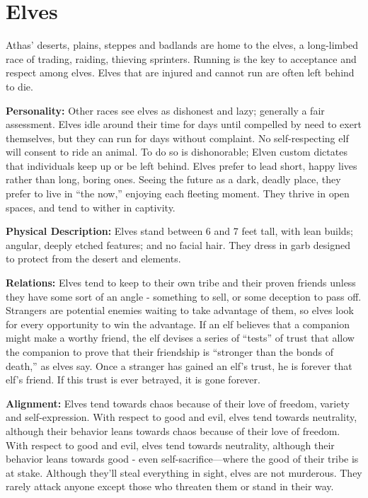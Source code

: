\section{Elves}

Athas' deserts, plains, steppes and badlands are home to the elves, a long-limbed race of trading, raiding, thieving sprinters. Running is the key to acceptance and respect among elves. Elves that are injured and cannot run are often left behind to die.

\textbf{Personality:} Other races see elves as dishonest and lazy; generally a fair assessment. Elves idle around their time for days until compelled by need to exert themselves, but they can run for days without complaint. No self-respecting elf will consent to ride an animal. To do so is dishonorable; Elven custom dictates that individuals keep up or be left behind. Elves prefer to lead short, happy lives rather than long, boring ones. Seeing the future as a dark, deadly place, they prefer to live in ``the now,'' enjoying each fleeting moment. They thrive in open spaces, and tend to wither in captivity.

\textbf{Physical Description:} Elves stand between 6 and 7 feet tall, with lean builds; angular, deeply etched features; and no facial hair. They dress in garb designed to protect from the desert and elements.

\textbf{Relations:} Elves tend to keep to their own tribe and their proven friends unless they have some sort of an angle - something to sell, or some deception to pass off. Strangers are potential enemies waiting to take advantage of them, so elves look for every opportunity to win the advantage. If an elf believes that a companion might make a worthy friend, the elf devises a series of ``tests'' of trust that allow the companion to prove that their friendship is ``stronger than the bonds of death,'' as elves say. Once a stranger has gained an elf's trust, he is forever that elf's friend. If this trust is ever betrayed, it is gone forever.

\textbf{Alignment:} Elves tend towards chaos because of their love of freedom, variety and self-expression. With respect to good and evil, elves tend towards neutrality, although their behavior leans towards chaos because of their love of freedom. With respect to good and evil, elves tend towards neutrality, although their behavior leans towards good - even self-sacrifice---where the good of their tribe is at stake. Although they'll steal everything in sight, elves are not murderous. They rarely attack anyone except those who threaten them or stand in their way.

